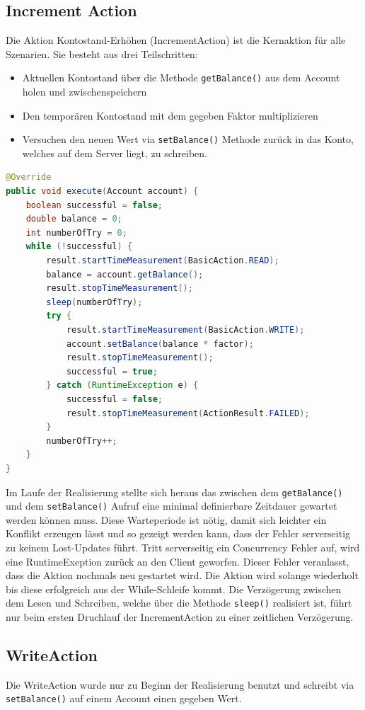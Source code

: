  
\subsection{Increment Action}
\label{sec:incrementAction}
Die Aktion Kontostand-Erhöhen (IncrementAction) ist die Kernaktion für alle Szenarien. 
Sie besteht aus drei Teilschritten:
\begin{itemize}
\item Aktuellen Kontostand über die Methode \verb+getBalance()+ aus dem Account holen und zwischenspeichern
\item Den temporären Kontostand mit dem gegeben Faktor multiplizieren
\item Versuchen den neuen Wert via \verb+setBalance()+ Methode zurück in das Konto, welches auf dem Server liegt, zu schreiben. 
\end{itemize}

\begin{lstlisting}[language=java, breaklines=true] 
@Override
public void execute(Account account) {
	boolean successful = false;
	double balance = 0;
	int numberOfTry = 0;
	while (!successful) {
		result.startTimeMeasurement(BasicAction.READ);
		balance = account.getBalance();
		result.stopTimeMeasurement();
		sleep(numberOfTry);
		try {
			result.startTimeMeasurement(BasicAction.WRITE);
			account.setBalance(balance * factor);
			result.stopTimeMeasurement();
			successful = true;
		} catch (RuntimeException e) {
			successful = false;
			result.stopTimeMeasurement(ActionResult.FAILED);
		}
		numberOfTry++;
	}
}
\end{lstlisting}
Im Laufe der Rea\-li\-sie\-rung stellte sich her\-aus das zwi\-schen dem \verb+getBalance()+ und dem \verb+setBalance()+ Auf\-ruf eine mi\-ni\-mal de\-fi\-nier\-ba\-re Zeit\-dauer ge\-wartet werden können muss. Diese Warteperiode ist nötig, damit sich leichter ein Konflikt erzeugen lässt und so gezeigt werden kann, dass der Fehler serverseitig zu keinem Lost-Updates führt.
\newline
Tritt serverseitig ein Concurrency Fehler auf, wird eine RuntimeExeption zurück an den Client geworfen. Dieser Fehler veranlasst, dass die Aktion nochmals neu gestartet wird. Die Aktion wird solange wiederholt bis diese erfolgreich aus der While-Schleife kommt. Die Verzögerung zwischen dem Lesen und Schreiben, welche über die Methode \verb+sleep()+ realisiert ist, führt nur beim ersten Druchlauf der IncrementAction zu einer zeitlichen Verzögerung.

\subsection{WriteAction}
\label{sec:writeAction}
Die WriteAction wurde nur zu Beginn der Realisierung benutzt und schreibt via \verb+setBalance()+ auf einem Account einen gegeben Wert. 

